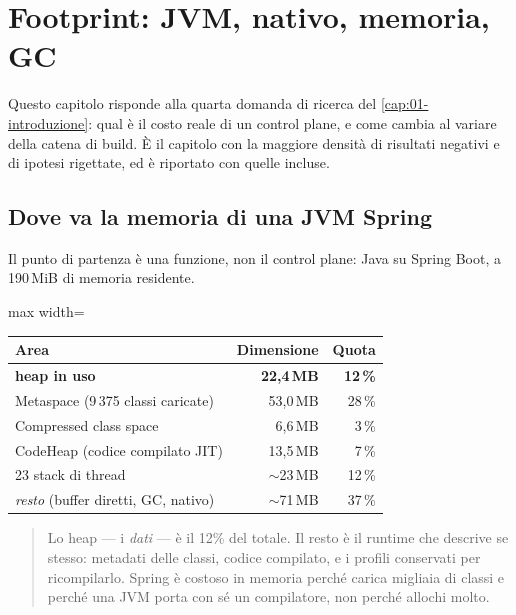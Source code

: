 \chapter{Footprint: JVM, nativo, memoria, GC}
\label{cap:24-footprint}

Questo capitolo risponde alla quarta domanda di ricerca del
\cref{cap:01-introduzione}: qual \`e il costo reale di un control plane, e come
cambia al variare della catena di build. \`E il capitolo con la maggiore densit\`a
di risultati negativi e di ipotesi rigettate, ed \`e riportato con quelle
incluse.

\section{Dove va la memoria di una JVM Spring}

Il punto di partenza \`e una funzione, non il control plane: 
Java su Spring Boot, a 190\,MiB di memoria residente.

\begin{center}
\small
\begin{adjustbox}{max width=\textwidth}
\begin{tabular}{@{}lrr@{}}
\toprule
\textbf{Area} & \textbf{Dimensione} & \textbf{Quota} \\
\midrule
\textbf{heap in uso} & \textbf{22{,}4\,MB} & \textbf{12\,\%} \\
Metaspace (9\,375 classi caricate) & 53{,}0\,MB & 28\,\% \\
Compressed class space & 6{,}6\,MB & 3\,\% \\
CodeHeap (codice compilato JIT) & 13{,}5\,MB & 7\,\% \\
23 stack di thread & $\sim$23\,MB & 12\,\% \\
\emph{resto} (buffer diretti, GC, nativo) & $\sim$71\,MB & 37\,\% \\
\bottomrule
\end{tabular}
\end{adjustbox}
\end{center}

\begin{quote}
Lo heap --- i \emph{dati} --- \`e il 12\% del totale. Il resto \`e il runtime che
descrive se stesso: metadati delle classi, codice compilato, e i profili
conservati per ricompilarlo. Spring \`e costoso in memoria perch\'e carica
migliaia di classi e perch\'e una JVM porta con s\'e un compilatore, non perch\'e
allochi molto.
\end{quote}

